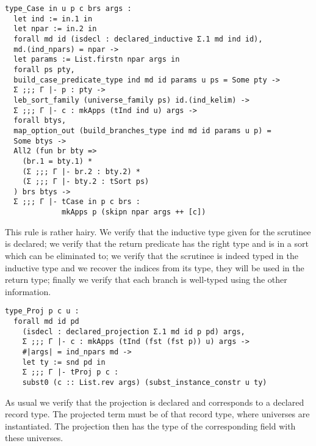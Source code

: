 \begin{verbatim}
type_Case in u p c brs args :
  let ind := in.1 in
  let npar := in.2 in
  forall md id (isdecl : declared_inductive Σ.1 md ind id),
  md.(ind_npars) = npar ->
  let params := List.firstn npar args in
  forall ps pty,
  build_case_predicate_type ind md id params u ps = Some pty ->
  Σ ;;; Γ |- p : pty ->
  leb_sort_family (universe_family ps) id.(ind_kelim) ->
  Σ ;;; Γ |- c : mkApps (tInd ind u) args ->
  forall btys,
  map_option_out (build_branches_type ind md id params u p) =
  Some btys ->
  All2 (fun br bty =>
    (br.1 = bty.1) *
    (Σ ;;; Γ |- br.2 : bty.2) *
    (Σ ;;; Γ |- bty.2 : tSort ps)
  ) brs btys ->
  Σ ;;; Γ |- tCase in p c brs :
             mkApps p (skipn npar args ++ [c])
\end{verbatim}
This rule is rather hairy. We verify that the inductive type given for the
scrutinee is declared; we verify that the return predicate has the right type and
is in a sort which can be eliminated to; we verify that the scrutinee is indeed
typed in the inductive type and we recover the indices from its type, they will
be used in the return type; finally we verify that each branch is well-typed
using the other information.

\begin{verbatim}
type_Proj p c u :
  forall md id pd
    (isdecl : declared_projection Σ.1 md id p pd) args,
    Σ ;;; Γ |- c : mkApps (tInd (fst (fst p)) u) args ->
    #|args| = ind_npars md ->
    let ty := snd pd in
    Σ ;;; Γ |- tProj p c :
    subst0 (c :: List.rev args) (subst_instance_constr u ty)
\end{verbatim}
As usual we verify that the projection is declared and corresponds to a declared
record type. The projected term must be of that record type, where universes
are instantiated. The projection then has the type of the corresponding field
with these universes.

